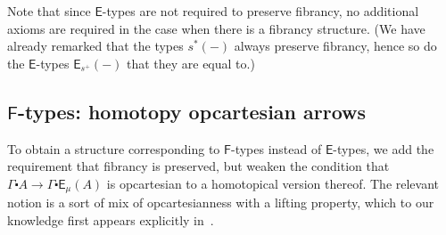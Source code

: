 \documentclass[10pt]{article}
\theoremstyle{definition}
\newcommand\Fsym{\ensuremath{\mathsf{F}}}
\newcommand\Esym{\ensuremath{\mathsf{E}}}
\newcommand\E[2]{\ensuremath{\mathsf{E}_{#1}(#2)}}
\newcommand\St[2]{\ensuremath{{#1}^*(#2)}}
\newcommand\TrPlusSym[1]{\ensuremath{{#1}^+}}
\newcommand\ce{\mathord{\centerdot}}
\begin{document}
Note that since $\Esym$-types are not required to preserve fibrancy, no additional axioms are required in the case when there is a fibrancy structure.
(We have already remarked that the types $\St{s}{-}$ always preserve fibrancy, hence so do the $\Esym$-types $\E{\TrPlusSym{s}}{-}$ that they are equal to.)


\subsection{$\Fsym$-types: homotopy opcartesian arrows}
\label{sec:htpy-opcartesian}

To obtain a structure corresponding to $\Fsym$-types instead of $\Esym$-types, we add the requirement that fibrancy is preserved, but weaken the condition that $\Gamma\ce A \to \Gamma \ce \E{\mu}{A}$ is opcartesian to a homotopical version thereof.
The relevant notion is a sort of mix of opcartesianness with a lifting property, which to our knowledge first appears explicitly in~\cite{CagneMellies2019}.
\end{document}
